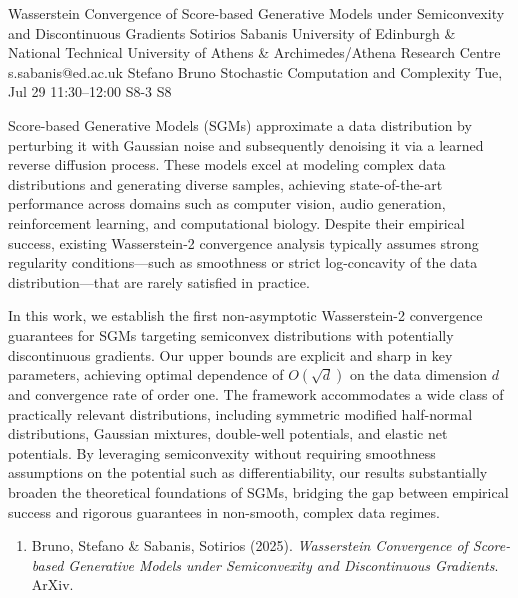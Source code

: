\documentclass[12pt,lettersize,oneside]{book} %
\begin{document}
\begin{talk}
  {Wasserstein Convergence of Score-based Generative Models under Semiconvexity and Discontinuous Gradients}%
  {Sotirios Sabanis}%
  {University of Edinburgh \& National Technical University of Athens \& Archimedes/Athena Research Centre}%
  {s.sabanis@ed.ac.uk}%
  {Stefano Bruno}%
  {Stochastic Computation and Complexity}%
  {Tue, Jul 29 11:30--12:00}%
  {S8-3}%
  {S8}%
    
   
\noindent Score-based Generative Models (SGMs) approximate a data distribution by perturbing it with Gaussian noise and subsequently denoising it via a learned reverse diffusion process. These models excel at modeling complex data distributions and generating diverse samples, achieving state-of-the-art performance across domains such as computer vision, audio generation, reinforcement learning, and computational biology. Despite their empirical success, existing Wasserstein-2 convergence analysis typically assumes strong regularity conditions—such as smoothness or strict log-concavity of the data distribution—that are rarely satisfied in practice.
  
 \noindent In this work, we establish the first non-asymptotic Wasserstein-2 convergence guarantees for SGMs targeting semiconvex distributions with potentially discontinuous gradients. Our upper bounds are explicit and sharp in key parameters, achieving optimal dependence of $O(\sqrt{d})$ on the data dimension $d$ and convergence rate of order one. The framework accommodates a wide class of practically relevant distributions, including symmetric modified half-normal distributions, Gaussian mixtures, double-well potentials, and elastic net potentials. By leveraging semiconvexity without requiring smoothness assumptions on the potential such as differentiability, our results substantially broaden the theoretical foundations of SGMs, bridging the gap between empirical success and rigorous guarantees in non-smooth, complex data regimes.

\medskip


\begin{enumerate}
 \item[{[1]}] Bruno, Stefano \& Sabanis, Sotirios (2025). {\it Wasserstein Convergence of Score-based Generative Models under Semiconvexity and Discontinuous Gradients}. ArXiv.
\end{enumerate}


\end{talk}
\end{document}
